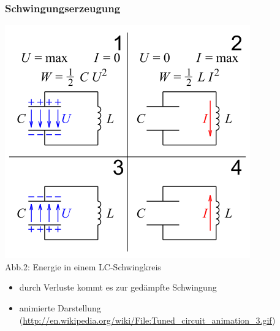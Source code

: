 \begin{frame}
  \frametitle{Schwingungserzeugung}
  \begin{center}
    \includegraphics[scale=0.35]{a04/Schwingkreis.png}\\
    {\tiny Abb.2: Energie in einem LC-Schwingkreis \cite{wmde}} \\
    \vspace{3mm}
    \begin{itemize}
      \item durch Verluste kommt es zur gedämpfte Schwingung\\
      \item animierte Darstellung (\url{http://en.wikipedia.org/wiki/File:Tuned_circuit_animation_3.gif})
    \end{itemize}
  \end{center}
\end{frame}

